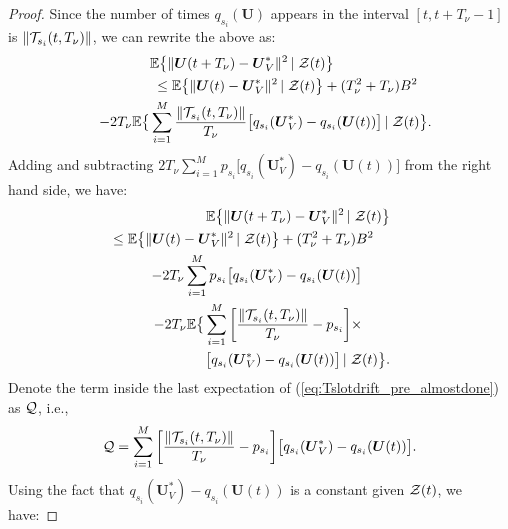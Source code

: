 \documentclass[journal]{IEEEtran}
\newcommand{\expect}[1]{\mathbb{E}\big\{#1\big\}}
\newcommand{\bv}[1]{{\boldsymbol{#1} }}
\newcommand{\script}[1]{{{\cal{#1} }}}
\begin{document}
\begin{proof}
Since the number of times $q_{s_i}(\bv{U})$ appears in the interval $[t, t+T_{\nu}-1]$ is $\|\script{T}_{s_i}(t, T_{\nu})\|$, we can rewrite the above as:
\begin{eqnarray}
&&\hspace{-.3in}\expect{\|\bv{U}(t+T_{\nu})-\bv{U}^*_V\|^2\left |\right. \script{Z}(t)}\qquad\qquad\qquad\quad\nonumber\\
&&\hspace{-.3in}\qquad\leq \expect{\|\bv{U}(t)-\bv{U}^*_V\|^2 \left|\right. \script{Z}(t)} + (T^2_{\nu}+T_{\nu})B^2\quad\nonumber\\
&&\hspace{-.3in}\qquad-2T_{\nu}\expect{\sum_{i=1}^{M} \frac{\|\script{T}_{s_i}(t, T_{\nu})\|}{T_{\nu}}\big[q_{s_i}(\bv{U}^*_V)-q_{s_i}(\bv{U}(t))\big]\left|\right. \script{Z}(t)}.\nonumber
\end{eqnarray}
Adding and subtracting $2T_{\nu}\sum_{i=1}^{M}p_{s_i}\big[q_{s_i}(\bv{U}^*_V)-q_{s_i}(\bv{U}(t))\big]$ from the right hand side, we have:
\begin{eqnarray}
&&\hspace{-.6in}\expect{\|\bv{U}(t+T_{\nu})-\bv{U}^*_V\|^2\left |\right. \script{Z}(t)}\label{eq:Tslotdrift_pre_almostdone}\\
&&\hspace{-.3in}\leq \expect{\|\bv{U}(t)-\bv{U}^*_V\|^2 \left|\right.  \script{Z}(t)} + (T^2_{\nu}+T_{\nu})B^2\quad\,\nonumber\\
&&\hspace{-.3in}\quad-2T_{\nu}\sum_{i=1}^{M}p_{s_i}\big[q_{s_i}(\bv{U}^*_V)-q_{s_i}(\bv{U}(t))\big]\quad\quad\nonumber\\
&&\hspace{-.3in}\quad-2T_{\nu}\expect{\sum_{i=1}^{M} \bigg[\frac{\|\script{T}_{s_i}(t, T_{\nu})\|}{T_{\nu}}-p_{s_i} \bigg]\times\quad\quad\nonumber\\
&&\qquad\qquad\big[q_{s_i}(\bv{U}^*_V)-q_{s_i}(\bv{U}(t))\big]\left|\right. \script{Z}(t)}.\nonumber
\end{eqnarray}
Denote the term inside the last expectation of (\ref{eq:Tslotdrift_pre_almostdone}) as $\script{Q}$, i.e., 
\begin{eqnarray}
\script{Q}=\sum_{i=1}^{M} \bigg[\frac{\|\script{T}_{s_i}(t, T_{\nu})\|}{T_{\nu}}-p_{s_i} \bigg]\big[q_{s_i}(\bv{U}^*_V)-q_{s_i}(\bv{U}(t))\big].
\end{eqnarray}
Using the fact that $q_{s_i}(\bv{U}^*_V)-q_{s_i}(\bv{U}(t))$ is a constant given $\script{Z}(t)$, we have:

\end{proof}
\end{document}
